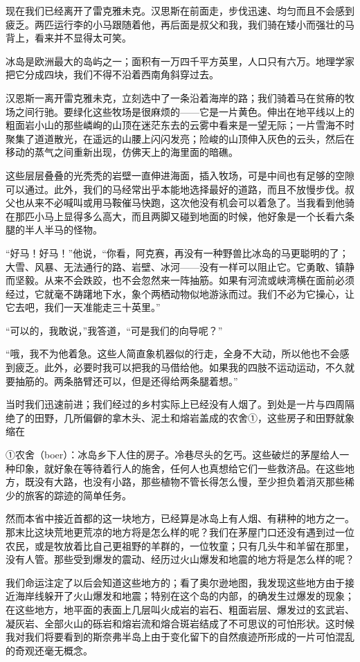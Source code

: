 \documentclass[10pt]{book}
\begin{document}
现在我们已经离开了雷克雅未克。汉思斯在前面走，步伐迅速、均匀而且不会感到疲乏。两匹运行李的小马跟随着他，再后面是叔父和我，我们骑在矮小而强壮的马背上，看来并不显得太可笑。

冰岛是欧洲最大的岛屿之一；面积有一万四千平方英里，人口只有六万。地理学家把它分成四块，我们不得不沿着西南角斜穿过去。

汉恩斯一离开雷克雅未克，立刻选中了一条沿着海岸的路；我们骑着马在贫瘠的牧场之间行驰。要绿化这些牧场是很麻烦的——它是一片黄色。伸出在地平线以上的粗面岩小山的那些嶙峋的山顶在迷茫东去的云雾中看来是一望无际；一片雪海不时聚集了道道散光，在遥远的山腰上闪闪发亮；险峻的山顶伸入灰色的云头，然后在移动的蒸气之间重新出现，仿佛天上的海里面的暗礁。

这些层层叠叠的光秃秃的岩壁一直伸进海面，插入牧场，可是中间也有足够的空隙可以通过。此外，我们的马经常出乎本能地选择最好的道路，而且不放慢步伐。叔父也从来不必喊叫或用马鞍催马快跑，这次他没有机会可以着急了。当我看到他骑在那匹小马上显得多么高大，而且两脚又碰到地面的时候，他好象是一个长看六条腿的半人半马的怪物。

“好马！好马！”他说，“你看，阿克赛，再没有一种野兽比冰岛的马更聪明的了；大雪、风暴、无法通行的路、岩壁、冰河——没有一样可以阻止它。它勇敢、镇静而坚毅。从来不会跌跤，也不会忽然来一阵抽筋。如果有河流或峡湾横在面前必须经过，它就毫不踌躇地下水，象个两栖动物似地游泳而过。我们不必为它操心，让它去吧，我们一天准能走三十英里。”

“可以的，我敢说，”我答道，“可是我们的向导呢？”

“哦，我不为他着急。这些人简直象机器似的行走，全身不大动，所以他也不会感到疲乏。此外，必要时我可以把我的马借给他。如果我的四肢不运动运动，不久就要抽筋的。两条胳臂还可以，但是还得给两条腿着想。”

当时我们迅速前进；我们经过的乡村实际上已经没有人烟了。到处是一片与四周隔绝了的田野，几所偏僻的拿木头、泥土和熔岩盖成的农舍①，这些房子和田野就象缩在

①农舍（boer）：冰岛乡下人住的房子。冷巷尽头的乞丐。这些破烂的茅屋给人一种印象，就好象在等待着行人的施舍，任何人也真想给它们一些救济品。在这些地方，既没有大路，也没有小路，那些植物不管长得怎么慢，至少担负着消灭那些稀少的旅客的踪迹的简单任务。

然而本省中接近首都的这一块地方，已经算是冰岛上有人烟、有耕种的地方之一。那末比这块荒地更荒凉的地方将是怎么样的呢？我们在茅屋门口还没有遇到过一位农民，或是牧放着比自己更祖野的羊群的，一位牧童；只有几头牛和羊留在那里，没有人管。那些受到爆发的震动、经历过火山爆发和地震的地方将是怎么样的呢？

我们命运注定了以后会知道这些地方的；看了奥尔逊地图，我发现这些地方由于接近海岸线躲开了火山爆发和地震；特别在这个岛的内部，的确发生过爆发的现象；在这些地方，地平面的表面上几层叫火成岩的岩石、粗面岩层、爆发过的玄武岩、凝灰岩、全部火山的砾岩和熔岩流和熔合斑岩结成了不可思议的可怕形状。这时候我对我们将要看到的斯奈弗半岛上由于变化留下的自然痕迹所形成的一片可怕混乱的奇观还毫无概念。
\end{document}
